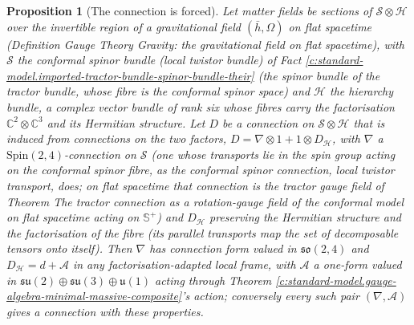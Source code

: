 \documentclass[11pt]{article}
\newtheorem{proposition}[theorem]{Proposition}
\theoremstyle{definition}
\theoremstyle{plain}
\newcommand{\changedmark}[2]{\marginpar{\raggedright\scriptsize\color{#1}#2}}
\providecommand{\C}{}\renewcommand{\C}{\mathbb{C}}
\providecommand{\CS}{}\renewcommand{\CS}{{\mathbb{S}^{+}}}
\providecommand{\hb}{}\renewcommand{\hb}{\bar{h}}
\providecommand{\su}{}\renewcommand{\su}{\mathfrak{su}}
\providecommand{\uu}{}\renewcommand{\uu}{\mathfrak{u}}
\begin{document}
\begin{proposition}[The connection is forced]\label{c:standard-model.connection-forced}
\changedmark{gray}{reworded}
Let matter fields be sections of $\mathcal{S} \otimes \mathcal{H}$ over the invertible region of a gravitational field $(\hb, \Omega)$ on flat spacetime (Definition \emph{Gauge Theory Gravity: the gravitational field on flat spacetime}), with $\mathcal{S}$ the conformal spinor bundle (local twistor bundle) of Fact \ref{c:standard-model.imported-tractor-bundle-spinor-bundle-their} (the spinor bundle of the tractor bundle, whose fibre is the conformal spinor space) and $\mathcal{H}$ the hierarchy bundle, a complex vector bundle of rank six whose fibres carry the factorisation $\C^{2} \otimes \C^{3}$ and its Hermitian structure. Let $D$ be a connection on $\mathcal{S} \otimes \mathcal{H}$ that is induced from connections on the two factors, $D = \nabla \otimes 1 + 1 \otimes D_{\mathcal{H}}$, with $\nabla$ a $\mathrm{Spin}(2,4)$-connection on $\mathcal{S}$ (one whose transports lie in the spin group acting on the conformal spinor fibre, as the conformal spinor connection, local twistor transport, does; on flat spacetime that connection is the tractor gauge field of Theorem \emph{The tractor connection as a rotation-gauge field of the conformal model on flat spacetime} acting on $\CS$) and $D_{\mathcal{H}}$ preserving the Hermitian structure and the factorisation of the fibre (its parallel transports map the set of decomposable tensors onto itself). Then $\nabla$ has connection form valued in $\mathfrak{so}(2,4)$ and $D_{\mathcal{H}} = d + \mathcal{A}$ in any factorisation-adapted local frame, with $\mathcal{A}$ a one-form valued in $\su(2) \oplus \su(3) \oplus \uu(1)$ acting through Theorem \ref{c:standard-model.gauge-algebra-minimal-massive-composite}'s action; conversely every such pair $(\nabla, \mathcal{A})$ gives a connection with these properties.
\end{proposition}
\end{document}
